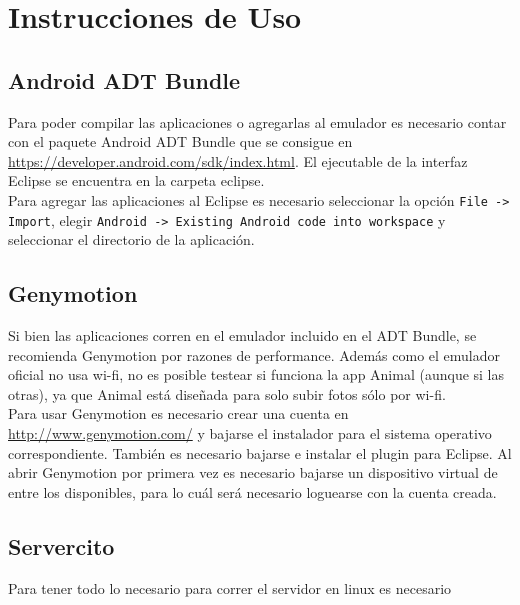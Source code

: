 \section{Instrucciones de Uso}

	\subsection{Android ADT Bundle}
		Para poder compilar las aplicaciones o agregarlas al emulador es necesario contar con el paquete Android ADT Bundle que se consigue en \url{https://developer.android.com/sdk/index.html}. El ejecutable de la interfaz Eclipse se encuentra en la carpeta eclipse. \\

		Para agregar las aplicaciones al Eclipse es necesario seleccionar la opción \texttt{File -> Import}, elegir \texttt{Android -> Existing Android code into workspace} y seleccionar el directorio de la aplicación.

	\subsection{Genymotion}
		Si bien las aplicaciones corren en el emulador incluido en el ADT Bundle, se recomienda Genymotion por razones de performance. Además como el emulador oficial no usa wi-fi, no es posible testear si funciona la app Animal (aunque si las otras), ya que Animal está diseñada para solo subir fotos sólo por wi-fi.\\

		Para usar Genymotion es necesario crear una cuenta en \url{http://www.genymotion.com/} y bajarse el instalador para el sistema operativo correspondiente. También es necesario bajarse e instalar el plugin para Eclipse. Al abrir Genymotion por primera vez es necesario bajarse un dispositivo virtual de entre los disponibles, para lo cuál será necesario loguearse con la cuenta creada.

	\subsection{Servercito}
		Para tener todo lo necesario para correr el servidor en linux es necesario

